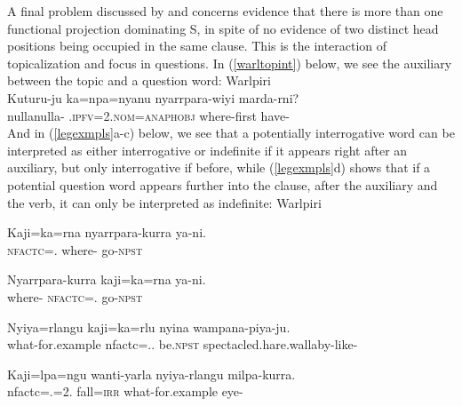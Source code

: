 \documentclass[output=paper,hidelinks]{langscibook}
\begin{document}
A final problem discussed by \citet{Laughren2002} and \citet{Legate2008warl2p}
concerns evidence that there is more than one functional projection dominating S, in
spite of no evidence of two distinct head positions being occupied in the same clause.
This is the interaction of topicalization and focus in questions. In
(\ref{warltopint}) below, we see the auxiliary between the topic and a question word:
\ea\label{warltopint}
Warlpiri  \citep[34]{Legate2008warl2p}\\
\gll Kuturu-ju ka=npa=nyanu nyarrpara-wiyi marda-rni?\\
nullanulla-{\TOP} \PRS.\textsc{ipfv}=2\SG.\textsc{nom}=\textsc{anaphobj} where-first have-\NPST\\
\z
And in (\ref{legexmpls}a-c)
below, we see that a potentially interrogative word can be interpreted as either 
interrogative or indefinite if it appears right after an auxiliary,
but only interrogative if before, while (\ref{legexmpls}d) shows that if a potential question word
appears further into the clause, after the auxiliary and the verb, it can only be interpreted as
indefinite:
\ea\label{legexmpls} Warlpiri
\begin{xlist}
\item
\gll Kaji=ka=rna nyarrpara-kurra ya-ni.\\
\textsc{nfactc}=\PRS. where-{\ALL} go-\textsc{npst}\\
\item
\gll Nyarrpara-kurra kaji=ka=rna ya-ni.\\
where-{\ALL} \textsc{nfactc}=\PRS.  go-\textsc{npst}\\
\item
\gll Nyiya=rlangu kaji=ka=rlu nyina wampana-piya-ju.\\
what-for.example {\sc nfactc}=\PRS.\PL.{\OBJ} be.\textsc{npst} spectacled.hare.wallaby-like-\TOP\\
\item
\gll Kaji=lpa=ngu wanti-yarla nyiya-rlangu milpa-kurra.\\
{\sc nfactc}=\PST.{\IPFV}=2\SG.{\OBJ} fall=\textsc{irr} what-for.example eye-\ALL\\
\end{xlist}
\end{document}
